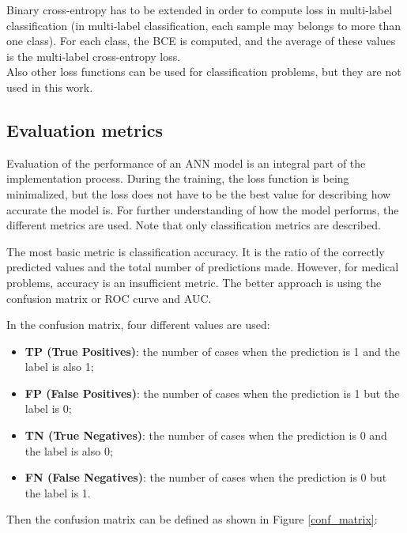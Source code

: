 \documentclass[thesis=B,english]{FITthesis}[2019/12/23]
\begin{document}
Binary cross-entropy has to be extended in order to compute loss in multi-label classification (in multi-label classification, each sample may belongs to more than one class). For each class, the BCE is computed, and the average of these values is the multi-label cross-entropy loss.  \\

Also other loss functions can be used for classification problems, but they are not used in this work.

\subsection{Evaluation metrics}
Evaluation of the performance of an ANN model is an integral part of the implementation process. During the training, the loss function is being minimalized, but the loss does not have to be the best value for describing how accurate the model is. For further understanding of how the model performs, the different metrics are used. Note that only classification metrics are described.

The most basic metric is classification accuracy. It is the ratio of the correctly predicted values and the total number of predictions made. However, for medical problems, accuracy is an insufficient metric. The better approach is using the confusion matrix or ROC curve and AUC.

In the confusion matrix, four different values are used:

\begin{itemize}
	\item \textbf{TP (True Positives)}: the number of cases when the prediction is 1 and the label is also 1;
	\item \textbf{FP (False Positives)}: the number of cases when the prediction is 1 but the label is 0;
	\item \textbf{TN (True Negatives)}: the number of cases when the prediction is 0 and the label is also 0;
	\item \textbf{FN (False Negatives)}: the number of cases when the prediction is 0 but the label is 1.
\end{itemize}

Then the confusion matrix can be defined as shown in Figure \ref{conf_matrix}:
\end{document}
